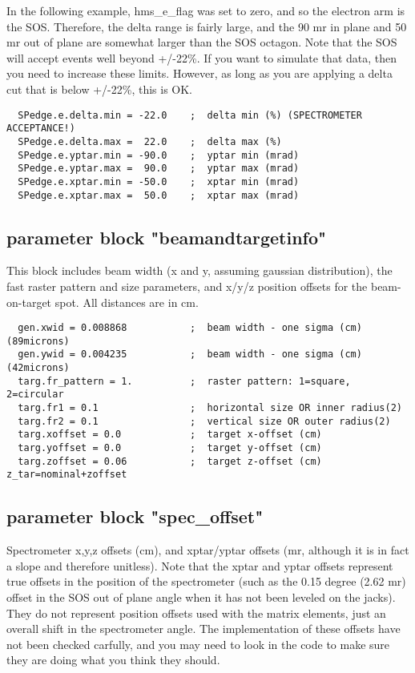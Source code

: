 In the following example, hms\_e\_flag was set to zero, and so the electron
arm is the SOS.  Therefore, the delta range is fairly large, and the
90 mr in plane and 50 mr out of plane are somewhat larger than the SOS
octagon.  Note that the SOS will accept events well beyond +/-22\%.  If
you want to simulate that data, then you need to increase these limits.
However, as long as you are applying a delta cut that is below +/-22\%,
this is OK.

\begin{verbatim}
  SPedge.e.delta.min = -22.0    ;  delta min (%) (SPECTROMETER ACCEPTANCE!)
  SPedge.e.delta.max =  22.0    ;  delta max (%)
  SPedge.e.yptar.min = -90.0    ;  yptar min (mrad)
  SPedge.e.yptar.max =  90.0    ;  yptar max (mrad)
  SPedge.e.xptar.min = -50.0    ;  xptar min (mrad)
  SPedge.e.xptar.max =  50.0    ;  xptar max (mrad)
\end{verbatim}



\subsection{parameter block "beamandtargetinfo"}

This block includes beam width (x and y, assuming gaussian distribution),
the fast raster pattern and size parameters, and x/y/z position offsets
for the beam-on-target spot.  All distances are in cm.

\begin{verbatim}
  gen.xwid = 0.008868           ;  beam width - one sigma (cm)  (89microns)
  gen.ywid = 0.004235           ;  beam width - one sigma (cm)  (42microns)
  targ.fr_pattern = 1.          ;  raster pattern: 1=square, 2=circular
  targ.fr1 = 0.1                ;  horizontal size OR inner radius(2)
  targ.fr2 = 0.1                ;  vertical size OR outer radius(2)
  targ.xoffset = 0.0            ;  target x-offset (cm)
  targ.yoffset = 0.0            ;  target y-offset (cm)
  targ.zoffset = 0.06           ;  target z-offset (cm) z_tar=nominal+zoffset
\end{verbatim}



\subsection{parameter block "spec\_offset"}

Spectrometer x,y,z offsets (cm), and xptar/yptar offsets (mr, although it is
in fact a slope and therefore unitless).  Note that the xptar and yptar
offsets represent true offsets in the position of the spectrometer (such
as the 0.15 degree (2.62 mr) offset in the SOS out of plane angle when
it has not been leveled on the jacks).  They do not represent position
offsets used with the matrix elements, just an overall shift in the
spectrometer angle.  The implementation of these offsets have not been checked
carfully, and you may need to look in the code to make sure they are doing
what you think they should.

